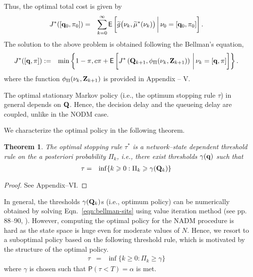 \documentclass[acmtosn]{acmtrans2m}
\newcommand{\prob}[1]{\mathsf{P}\left(#1\right)}
\newcommand{\nn}{\nonumber \\}
{\theorembodyfont{\rmfamily}
\newtheorem{remarks}{Remark}[section]} \newtheorem{theorem}{Theorem}
\begin{document}
Thus, the optimal total cost is given by 
\begin{eqnarray} 
\label{eqn:need-to-solve} 
J^*([{\bf q}_0,\pi_0]) & = & 
    \sum_{k=0}^\infty {\mathsf E}\left[\widetilde{g}\big(\nu_k,\widetilde{\mu}^*(\nu_k)\big) \bigg\arrowvert \nu_0 = [{\bf q}_0,\pi_0] \right]. 
\end{eqnarray}
The solution to the above problem is obtained following the Bellman's equation, 
\begin{eqnarray} 
\label{eqn:bellman-sits} 
J^*([{\bf q}, \pi]) & := & \min\left\{1-\pi, c\pi + {\mathsf E}\left[
J^*\left({\bf Q}_{k+1},\phi_{\Pi}(\nu_k, {\bf Z}_{k+1})\right) \bigg\arrowvert \nu_k = [{\bf q},\pi] \right] \right\}.\nn
\end{eqnarray} 
where the function $\phi_{\Pi}(\nu_k, {\bf Z}_{k+1})$ is
provided in Appendix -- V.


\begin{remarks}
\label{thm:decision_queueing_coupling}
The optimal stationary Markov policy (i.e., the optimum stopping 
rule $\tau$) in general depends on ${\bf Q}$. Hence, the decision 
delay and the queueing delay are coupled, unlike in the {\sf NODM} case. 
\end{remarks}

\noindent
We characterize the optimal policy in the following theorem.
\begin{theorem}
The optimal stopping rule $\tau^*$ is a network--state dependent 
threshold rule on the a posteriori probability $\Pi_k$, i.e.,
there exist thresholds $\gamma({\bf q})$ such that
\begin{eqnarray} 
\tau & = & \inf\{k \geqslant 0 : \Pi_k \geqslant \gamma({\bf Q}_k)\}
\end{eqnarray} 
\end{theorem}
\begin{proof}
See Appendix--VI.
\end{proof}

In general, the thresholds $\gamma({\bf Q}_k)$s (i.e., optimum policy) 
can be numerically obtained by solving 
Eqn.~\ref{eqn:bellman-sits} using value iteration method 
(see pp. 88--90, \cite{books.bertsekas00b}). However, computing the optimal policy for the
{\sf NADM} procedure is hard as the state space is huge even for moderate 
values of $N$. Hence, we resort to a suboptimal policy based on the 
following threshold rule, which is motivated by the structure of the 
optimal policy.    
\begin{eqnarray}
\label{eqn:nadm-subopt}
\tau & = & \inf\{k \geqslant 0 : \Pi_k \geqslant \gamma\}
\end{eqnarray}
where $\gamma$ is chosen such that $\prob{\tau < T} = \alpha$ is met.
\end{document}
